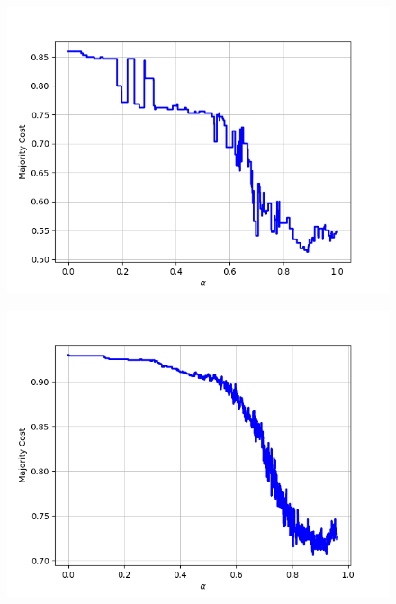 \begin{figure}[H]
\begin{minipage}{.24\textwidth}
  {\includegraphics[width=\linewidth]{plots/omniglot-intra-sc/Hebrew}}
\end{minipage}
\begin{minipage}{.24\textwidth}
  \centering
  {\includegraphics[width=\linewidth]{plots/omniglot-intra-sc/Inuktitut_(Canadian_Aboriginal_Syllabics)}}
\end{minipage}
\begin{minipage}{.24\textwidth}
  \centering

\end{minipage}
\end{figure}
